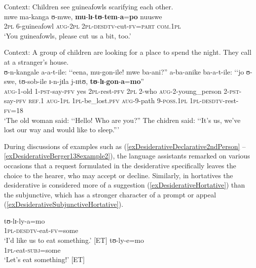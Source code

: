\begin{exe}
\ex \label{exDesiderativeBerger138example1}
Context: Children see guineafowls scarifying each other.\\
\gll mwe ma-kanga ʊ-mwe, \textbf{mu}-\textbf{lɪ}-\textbf{tʊ}-\textbf{tem}-\textbf{a}=\textbf{po} nuuswe\\
\textsc{2pl} 6-guineafowl \textsc{aug}-\textsc{2pl} \textsc{2pl}-\textsc{desdtv}-cut-\textsc{fv}=\textsc{part} \textsc{com.1pl}\\
\glt \lq You guineafowls, please cut us a bit, too.' \citep[116]{BergerP1933}

\ex \label{exDesiderativeBerger138example2}
Context: A group of children are looking for a place to spend the night. They call at a stranger's house.\\
\gll ʊ-n-kangale a-a-t-ile: \textup{\lq\lq}eena, mu-gon-ile! mwe ba-ani?\textup{''} a-ba-anike ba-a-t-ile: \textup{\lq\lq}jo ʊ-swe, tʊ-sob-ile ɪ-n-jɪla j-ɪɪtʊ, \textbf{tʊ}-\textbf{lɪ}-\textbf{gon}-\textbf{a}=\textbf{mo}\textup{''}\\
\textsc{aug}-1-old 1-\textsc{pst}-say-\textsc{pfv} \phantom{\lq\lq}yes \textsc{2pl}-rest-\textsc{pfv} \textsc{2pl} 2-who \textsc{aug}-2-young\_person 2-\textsc{pst}-say-\textsc{pfv} \phantom{\lq\lq}\textsc{ref.1} \textsc{aug}-\textsc{1pl} \textsc{1pl}-be\_lost\textsc{.pfv} \textsc{aug}-9-path 9-\textsc{poss.1pl} \textsc{1pl}-\textsc{desdtv}-rest-\textsc{fv}=18\\
\glt \lq The old woman said: \lq\lq Hello! Who are you?'' The chidren said: \lq\lq It's us, we've lost our way and would like to sleep.''{}' \citep[137]{BergerP1933}
\end{exe}

During discussions of examples such as (\ref{exDesiderativeDeclarative2ndPerson} -- \ref{exDesiderativeBerger138example2}), the language assistants remarked on various occasions that a request formulated in the desiderative specifically leaves the choice to the hearer, who may accept or decline. Similarly, in hortatives the desiderative  is considered more of a suggestion (\ref{exDesiderativeHortative}) than the subjunctive, which has a stronger character of a prompt or appeal (\ref{exDesiderativeSubjunctiveHortative}).
\begin{exe}
\ex\begin{xlist}
\ex\label{exDesiderativeHortative} \gll tʊ-lɪ-ly-a=mo\\
\textsc{1pl}-\textsc{desdtv}-eat-\textsc{fv}=some\\
\glt `I'd like us to eat something.' [ET]
\ex \label{exDesiderativeSubjunctiveHortative}\gll tʊ-ly-e=mo\\
\textsc{1pl}-eat-\textsc{subj}=some\\
\glt `Let's eat something!' [ET]
\end{xlist}
\end{exe}

